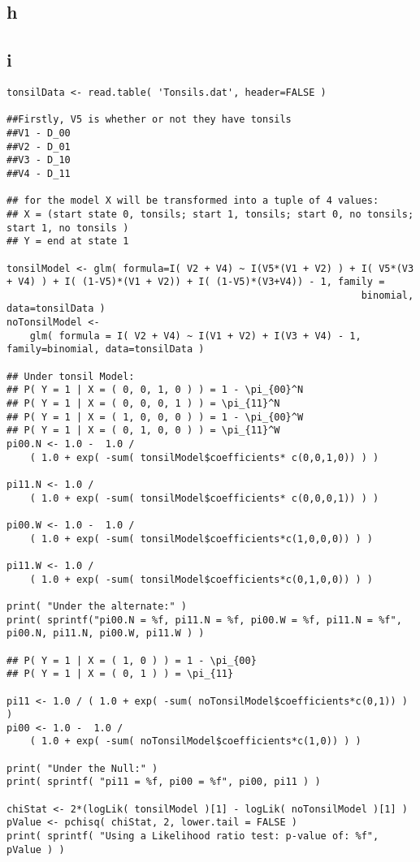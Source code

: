\documentclass[11pt]{article}
\begin{document}
\subsection{h}
\label{sec-1-8}

\subsection{i}
\label{sec-1-9}

\begin{verbatim}
tonsilData <- read.table( 'Tonsils.dat', header=FALSE )

##Firstly, V5 is whether or not they have tonsils
##V1 - D_00
##V2 - D_01
##V3 - D_10
##V4 - D_11

## for the model X will be transformed into a tuple of 4 values:
## X = (start state 0, tonsils; start 1, tonsils; start 0, no tonsils; start 1, no tonsils )
## Y = end at state 1

tonsilModel <- glm( formula=I( V2 + V4) ~ I(V5*(V1 + V2) ) + I( V5*(V3
+ V4) ) + I( (1-V5)*(V1 + V2)) + I( (1-V5)*(V3+V4)) - 1, family =
                                                             binomial, data=tonsilData )
noTonsilModel <-
    glm( formula = I( V2 + V4) ~ I(V1 + V2) + I(V3 + V4) - 1, family=binomial, data=tonsilData )

## Under tonsil Model:
## P( Y = 1 | X = ( 0, 0, 1, 0 ) ) = 1 - \pi_{00}^N
## P( Y = 1 | X = ( 0, 0, 0, 1 ) ) = \pi_{11}^N
## P( Y = 1 | X = ( 1, 0, 0, 0 ) ) = 1 - \pi_{00}^W
## P( Y = 1 | X = ( 0, 1, 0, 0 ) ) = \pi_{11}^W
pi00.N <- 1.0 -  1.0 /
    ( 1.0 + exp( -sum( tonsilModel$coefficients* c(0,0,1,0)) ) )

pi11.N <- 1.0 /
    ( 1.0 + exp( -sum( tonsilModel$coefficients* c(0,0,0,1)) ) )

pi00.W <- 1.0 -  1.0 /
    ( 1.0 + exp( -sum( tonsilModel$coefficients*c(1,0,0,0)) ) )

pi11.W <- 1.0 /
    ( 1.0 + exp( -sum( tonsilModel$coefficients*c(0,1,0,0)) ) )

print( "Under the alternate:" )
print( sprintf("pi00.N = %f, pi11.N = %f, pi00.W = %f, pi11.N = %f", pi00.N, pi11.N, pi00.W, pi11.W ) )

## P( Y = 1 | X = ( 1, 0 ) ) = 1 - \pi_{00}
## P( Y = 1 | X = ( 0, 1 ) ) = \pi_{11}

pi11 <- 1.0 / ( 1.0 + exp( -sum( noTonsilModel$coefficients*c(0,1)) ) )
pi00 <- 1.0 -  1.0 /
    ( 1.0 + exp( -sum( noTonsilModel$coefficients*c(1,0)) ) )

print( "Under the Null:" )
print( sprintf( "pi11 = %f, pi00 = %f", pi00, pi11 ) )

chiStat <- 2*(logLik( tonsilModel )[1] - logLik( noTonsilModel )[1] )
pValue <- pchisq( chiStat, 2, lower.tail = FALSE )
print( sprintf( "Using a Likelihood ratio test: p-value of: %f", pValue ) )
\end{verbatim}
\end{document}
